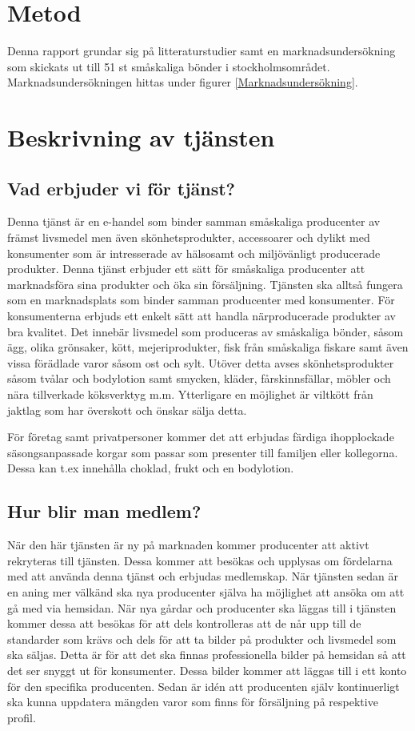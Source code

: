 \documentclass[10pt,a4paper,oneside]{article}
\begin{document}
\newpage

\section{Metod}
Denna rapport grundar sig på litteraturstudier samt en marknadsundersökning som skickats ut till 51 st småskaliga bönder i stockholmsområdet. Marknadsundersökningen hittas under figurer \ref{Marknadsundersökning}. 
\newpage

\section{Beskrivning av tjänsten}
\subsection{Vad erbjuder vi för tjänst?}
Denna tjänst är en e-handel som binder samman småskaliga producenter av främst livsmedel men även skönhetsprodukter, accessoarer och dylikt med konsumenter som är intresserade av hälsosamt och miljövänligt producerade produkter. Denna tjänst erbjuder ett sätt för småskaliga producenter att marknadsföra sina produkter och öka sin försäljning. Tjänsten ska alltså fungera som en marknadsplats som binder samman producenter med konsumenter. För konsumenterna erbjuds ett enkelt sätt att handla närproducerade produkter av bra kvalitet. Det innebär livsmedel som produceras av småskaliga bönder, såsom ägg, olika grönsaker, kött, mejeriprodukter, fisk från småskaliga fiskare samt även vissa förädlade varor såsom ost och sylt. Utöver detta avses skönhetsprodukter såsom tvålar och bodylotion samt smycken, kläder, fårskinnsfällar, möbler och nära tillverkade köksverktyg m.m. Ytterligare en möjlighet är viltkött från jaktlag som har överskott och önskar sälja detta. 

För företag samt privatpersoner kommer det att erbjudas färdiga ihopplockade säsongsanpassade korgar som passar som presenter till familjen eller kollegorna. Dessa kan t.ex innehålla choklad, frukt och en bodylotion.  

\subsection{Hur blir man medlem?}
När den här tjänsten är ny på marknaden kommer producenter att aktivt rekryteras till tjänsten. Dessa kommer att besökas och upplysas om fördelarna med att använda denna tjänst och erbjudas medlemskap. När tjänsten sedan är en aning mer välkänd ska nya producenter själva ha möjlighet att ansöka om att gå med via hemsidan. När nya gårdar och producenter ska läggas till i tjänsten kommer dessa att besökas för att dels kontrolleras att de når upp till de standarder som krävs och dels för att ta bilder på produkter och livsmedel som ska säljas. Detta är för att det ska finnas professionella bilder på hemsidan så att det ser snyggt ut för konsumenter. Dessa bilder kommer att läggas till i ett konto för den specifika producenten. Sedan är idén att producenten själv kontinuerligt ska kunna uppdatera mängden varor som finns för försäljning på respektive profil.  
\end{document}
